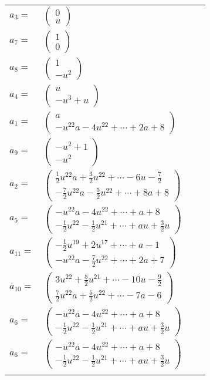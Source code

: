 \documentclass[1p]{elsarticle_modified}
\theoremstyle{definition}
\begin{document}
\begin{tabular}{m{7pt} m{180pt} m{7pt} m{180pt} }
\flushright $a_{3}=$&$\begin{pmatrix}0\\u\end{pmatrix}$ \\
\flushright $a_{7}=$&$\begin{pmatrix}1\\0\end{pmatrix}$ \\
\flushright $a_{8}=$&$\begin{pmatrix}1\\- u^2\end{pmatrix}$ \\
\flushright $a_{4}=$&$\begin{pmatrix}u\\- u^3+u\end{pmatrix}$ \\
\flushright $a_{1}=$&$\begin{pmatrix}a\\- u^{22} a-4 u^{22}+\cdots+2 a+8\end{pmatrix}$ \\
\flushright $a_{9}=$&$\begin{pmatrix}- u^2+1\\- u^2\end{pmatrix}$ \\
\flushright $a_{2}=$&$\begin{pmatrix}\frac{1}{2} u^{22} a+\frac{3}{2} u^{22}+\cdots-6 u-\frac{7}{2}\\-\frac{7}{2} u^{22} a-\frac{5}{2} u^{22}+\cdots+8 a+8\end{pmatrix}$ \\
\flushright $a_{5}=$&$\begin{pmatrix}- u^{22} a-4 u^{22}+\cdots+a+8\\-\frac{1}{2} u^{22}-\frac{1}{2} u^{21}+\cdots+a u+\frac{3}{2} u\end{pmatrix}$ \\
\flushright $a_{11}=$&$\begin{pmatrix}-\frac{1}{2} u^{19}+2 u^{17}+\cdots+a-1\\- u^{22} a-\frac{7}{2} u^{22}+\cdots+2 a+7\end{pmatrix}$ \\
\flushright $a_{10}=$&$\begin{pmatrix}3 u^{22}+\frac{5}{2} u^{21}+\cdots-10 u-\frac{9}{2}\\\frac{7}{2} u^{22} a+\frac{5}{2} u^{22}+\cdots-7 a-6\end{pmatrix}$ \\
\flushright $a_{6}=$&$\begin{pmatrix}- u^{22} a-4 u^{22}+\cdots+a+8\\-\frac{1}{2} u^{22}-\frac{1}{2} u^{21}+\cdots+a u+\frac{3}{2} u\end{pmatrix}$\\ \flushright $a_{6}=$&$\begin{pmatrix}- u^{22} a-4 u^{22}+\cdots+a+8\\-\frac{1}{2} u^{22}-\frac{1}{2} u^{21}+\cdots+a u+\frac{3}{2} u\end{pmatrix}$\\&\end{tabular}
\end{document}
